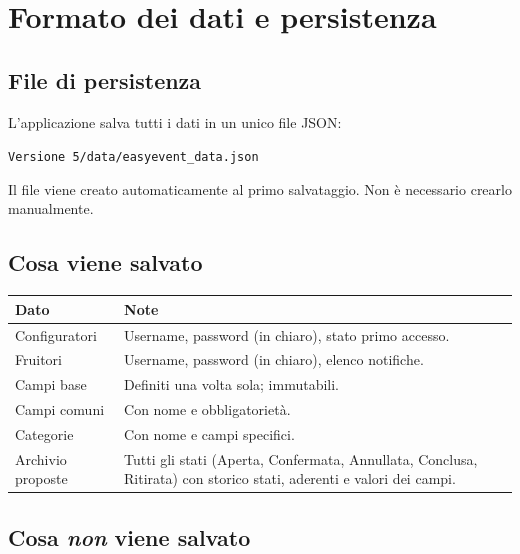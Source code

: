 \documentclass[12pt,a4paper,oneside]{report}
\newcommand{\file}[1]{\texttt{\small#1}}
\begin{document}
\chapter{Formato dei dati e persistenza}
\label{cap:persistenza}

\section{File di persistenza}

L'applicazione salva tutti i dati in un unico file JSON:
\begin{center}
\file{Versione 5/data/easyevent\_data.json}
\end{center}

Il file viene creato automaticamente al primo salvataggio. Non è necessario crearlo manualmente.

\section{Cosa viene salvato}

\begin{center}
\begin{tabular}{L{5cm}L{8cm}}
\toprule
\textbf{Dato} & \textbf{Note} \\
\midrule
Configuratori & Username, password (in chiaro\footnotemark), stato primo accesso. \\
Fruitori & Username, password (in chiaro), elenco notifiche. \\
Campi base & Definiti una volta sola; immutabili. \\
Campi comuni & Con nome e obbligatorietà. \\
Categorie & Con nome e campi specifici. \\
Archivio proposte & Tutti gli stati (Aperta, Confermata, Annullata, Conclusa, Ritirata) con storico stati, aderenti e valori dei campi. \\
\bottomrule
\end{tabular}
\end{center}

\section{Cosa \emph{non} viene salvato}
\end{document}
